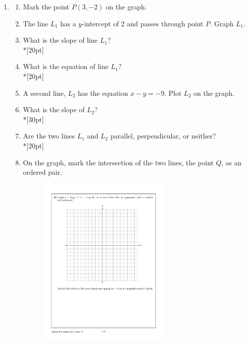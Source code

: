 \documentclass[12pt, oneside]{article}
\begin{document}
\begin{enumerate}
\newpage
\item  
\begin{enumerate}
    \item Mark the point $P(3, -2)$ on the graph.
    \item The line $L_1$ has a $y$-intercept of 2 and passes through point $P$. Graph $L_1$.
    \item What is the slope of line $L_1$?\\*[20pt]
    \item What is the equation of line $L_1$?\\*[20pt]
    \item A second line, $L_2$ has the equation $x-y=-9$. Plot $L_2$ on the graph.
    \item What is the slope of $L_2$?\\*[30pt]
    \item Are the two lines $L_1$ and $L_2$ parallel, perpendicular, or neither?\\*[20pt]
    \item On the graph, mark the intersection of the two lines, the point $Q$, as an ordered pair.


\begin{figure}[!ht]
    \centering
    \includegraphics[width=0.65\textwidth]{regents-grid.pdf}
\end{figure}
\end{enumerate}


\end{enumerate}
\end{document}
